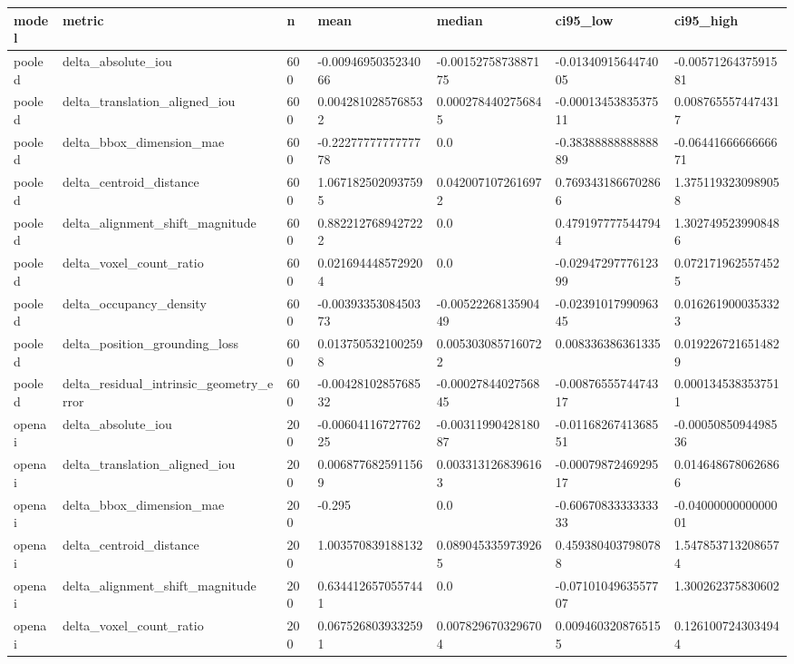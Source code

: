\begin{tabular}{lllllll}
model & metric & n & mean & median & ci95_low & ci95_high \\\hline
pooled & delta\_absolute\_iou & 600 & -0.0094695035234066 & -0.0015275873887175 & -0.0134091564474005 & -0.0057126437591581 \\
pooled & delta\_translation\_aligned\_iou & 600 & 0.0042810285768532 & 0.0002784402756845 & -0.0001345383537511 & 0.0087655574474317 \\
pooled & delta\_bbox\_dimension\_mae & 600 & -0.2227777777777778 & 0.0 & -0.3838888888888889 & -0.0644166666666671 \\
pooled & delta\_centroid\_distance & 600 & 1.0671825020937595 & 0.0420071072616972 & 0.7693431866702866 & 1.3751193230989058 \\
pooled & delta\_alignment\_shift\_magnitude & 600 & 0.8822127689427222 & 0.0 & 0.4791977775447944 & 1.3027495239908486 \\
pooled & delta\_voxel\_count\_ratio & 600 & 0.0216944485729204 & 0.0 & -0.0294729777612399 & 0.0721719625574525 \\
pooled & delta\_occupancy\_density & 600 & -0.0039335308450373 & -0.0052226813590449 & -0.0239101799096345 & 0.0162619000353323 \\
pooled & delta\_position\_grounding\_loss & 600 & 0.0137505321002598 & 0.0053030857160722 & 0.008336386361335 & 0.0192267216514829 \\
pooled & delta\_residual\_intrinsic\_geometry\_error & 600 & -0.0042810285768532 & -0.0002784402756845 & -0.0087655574474317 & 0.0001345383537511 \\
openai & delta\_absolute\_iou & 200 & -0.0060411672776225 & -0.0031199042818087 & -0.0116826741368551 & -0.0005085094498536 \\
openai & delta\_translation\_aligned\_iou & 200 & 0.0068776825911569 & 0.0033131268396163 & -0.0007987246929517 & 0.0146486780626866 \\
openai & delta\_bbox\_dimension\_mae & 200 & -0.295 & 0.0 & -0.6067083333333333 & -0.0400000000000001 \\
openai & delta\_centroid\_distance & 200 & 1.003570839188132 & 0.0890453359739265 & 0.4593804037980788 & 1.5478537132086574 \\
openai & delta\_alignment\_shift\_magnitude & 200 & 0.6344126570557441 & 0.0 & -0.0710104963557707 & 1.300262375830602 \\
openai & delta\_voxel\_count\_ratio & 200 & 0.0675268039332591 & 0.0078296703296704 & 0.0094603208765155 & 0.1261007243034944 \\

\end{tabular}
